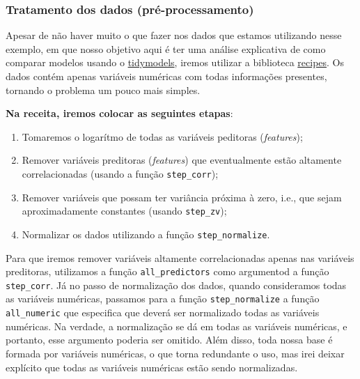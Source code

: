 \documentclass[
  letterpaper,
  DIV=11,
  numbers=noendperiod,
  oneside]{scrartcl}
\providecommand{\tightlist}{%
  \setlength{\itemsep}{0pt}\setlength{\parskip}{0pt}}\usepackage{longtable,booktabs,array}
\begin{document}
\hypertarget{tratamento-dos-dados-pruxe9-processamento}{%
\subsubsection{Tratamento dos dados
(pré-processamento)}\label{tratamento-dos-dados-pruxe9-processamento}}

Apesar de não haver muito o que fazer nos dados que estamos utilizando
nesse exemplo, em que nosso objetivo aqui é ter uma análise explicativa
de como comparar modelos usando o
\href{https://www.tidymodels.org/}{tidymodels}, iremos utilizar a
biblioteca \href{https://recipes.tidymodels.org/}{recipes}. Os dados
contém apenas variáveis numéricas com todas informações presentes,
tornando o problema um pouco mais simples.

\textbf{Na receita, iremos colocar as seguintes etapas}:

\begin{enumerate}
\def\labelenumi{\arabic{enumi}.}
\tightlist
\item
  Tomaremos o logarítmo de todas as variáveis peditoras
  (\emph{features});
\item
  Remover variáveis preditoras (\emph{features}) que eventualmente estão
  altamente correlacionadas (usando a função \texttt{step\_corr});
\item
  Remover variáveis que possam ter variância próxima à zero, i.e., que
  sejam aproximadamente constantes (usando \texttt{step\_zv});
\item
  Normalizar os dados utilizando a função \texttt{step\_normalize}.
\end{enumerate}

Para que iremos remover variáveis altamente correlacionadas apenas nas
variáveis preditoras, utilizamos a função \texttt{all\_predictors} como
argumentod a função \texttt{step\_corr}. Já no passo de normalização dos
dados, quando consideramos todas as variáveis numéricas, passamos para a
função \texttt{step\_normalize} a função \texttt{all\_numeric} que
especifica que deverá ser normalizado todas as variáveis numéricas. Na
verdade, a normalização se dá em todas as variáveis numéricas, e
portanto, esse argumento poderia ser omitido. Além disso, toda nossa
base é formada por variáveis numéricas, o que torna redundante o uso,
mas irei deixar explícito que todas as variáveis numéricas estão sendo
normalizadas.
\end{document}
